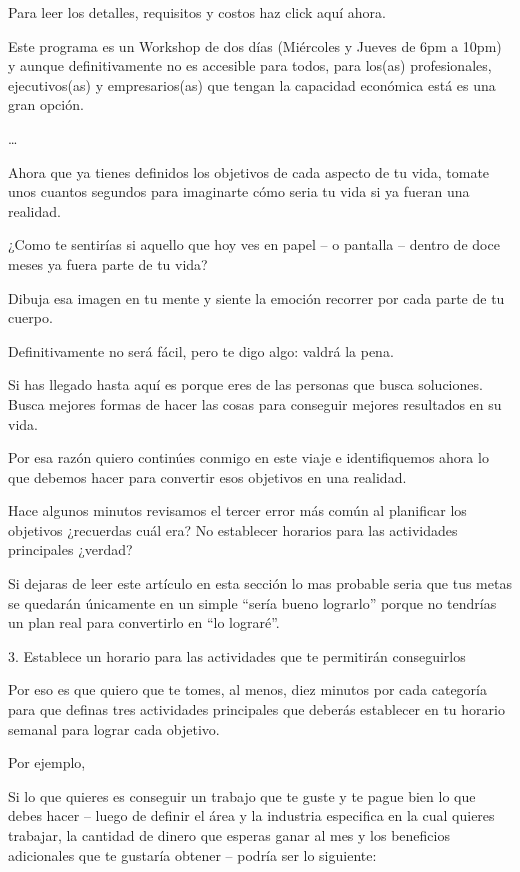 \documentclass[12pt]{book}
\begin{document}
Para leer los detalles, requisitos y costos haz click aquí ahora.

Este programa es un Workshop de dos días (Miércoles y Jueves de 6pm a 10pm) y aunque definitivamente no es accesible para todos, para los(as) profesionales, ejecutivos(as) y empresarios(as) que tengan la capacidad económica está es una gran opción.

…

Ahora que ya tienes definidos los objetivos de cada aspecto de tu vida, tomate unos cuantos segundos para imaginarte cómo seria tu vida si ya fueran una realidad.

¿Como te sentirías si aquello que hoy ves en papel – o pantalla – dentro de doce meses ya fuera parte de tu vida?

Dibuja esa imagen en tu mente y siente la emoción recorrer por cada parte de tu cuerpo.

Definitivamente no será fácil, pero te digo algo: valdrá la pena.

Si has llegado hasta aquí es porque eres de las personas que busca soluciones. Busca mejores formas de hacer las cosas para conseguir mejores resultados en su vida.

Por esa razón quiero continúes conmigo en este viaje e identifiquemos ahora lo que debemos hacer para convertir esos objetivos en una realidad.

Hace algunos minutos revisamos el tercer error más común al planificar los objetivos ¿recuerdas cuál era? No establecer horarios para las actividades principales ¿verdad?

Si dejaras de leer este artículo en esta sección lo mas probable seria que tus metas se quedarán únicamente en un simple “sería bueno lograrlo” porque no tendrías un plan real para convertirlo en “lo lograré”.

3. Establece un horario para las actividades que te permitirán conseguirlos

Por eso es que quiero que te tomes, al menos, diez minutos por cada categoría para que definas tres actividades principales que deberás establecer en tu horario semanal para lograr cada objetivo.

Por ejemplo,

Si lo que quieres es conseguir un trabajo que te guste y te pague bien lo que debes hacer – luego de definir el área y la industria especifica en la cual quieres trabajar, la cantidad de dinero que esperas ganar al mes y los beneficios adicionales que te gustaría obtener – podría ser lo siguiente:
\end{document}
